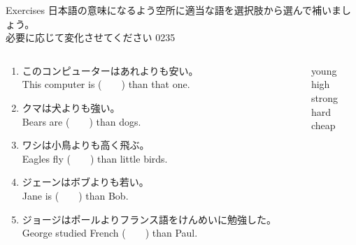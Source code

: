 \documentclass[aspectratio=169,xcolor={dvipsnames,table}]{beamer}
\begin{document}
\begin{frame}[plain]{Exercises}
日本語の意味になるよう空所に適当な語を選択肢から選んで補いましょう。\\必要に応じて変化させてください%
\hfill{\tiny 0235}\,{\scriptsize {}}

\begin{columns}[t]
 \begin{column}{.78\textwidth}
   \begin{enumerate}
  \item このコンピューターはあれよりも安い。\\
	This computer is (~~~~) than that one. 
    \item クマは犬よりも強い。\\
	Bears are (~~~~) than dogs. 
    \item ワシは小鳥よりも高く飛ぶ。\\
	Eagles fly (~~~~) than little birds. 
    \item ジェーンはボブよりも若い。\\
	Jane is (~~~~) than Bob. 
    \item ジョージはポールよりフランス語をけんめいに勉強した。\\
	George studied French (~~~~) than Paul. 
 \end{enumerate}
 \end{column}
\begin{column}{.2\textwidth}
 \begin{tcolorbox}
  young\\
  high\\
  strong\\
  hard\\
  cheap
 \end{tcolorbox}
\end{column}
\end{columns}
\end{frame}
\end{document}
